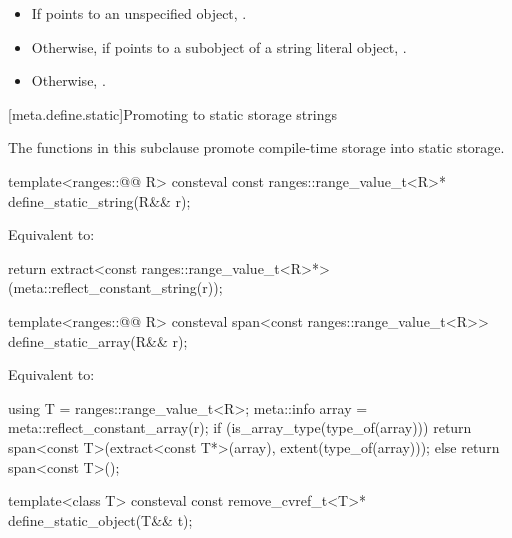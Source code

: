 \begin{itemdescr}
\pnum
\returns
\begin{itemize}
\item
  If  points to an unspecified object,
  .
\item
  Otherwise, if  points to a subobject
  of a string literal object,
  .
\item
  Otherwise, .
\end{itemize}
\end{itemdescr}

[meta.define.static]{Promoting to static storage strings}

\pnum
The functions in this subclause promote compile-time storage into static storage.

%
\begin{itemdecl}
template<ranges::@@ R>
  consteval const ranges::range_value_t<R>* define_static_string(R&& r);
\end{itemdecl}

\begin{itemdescr}
\pnum
\effects
Equivalent to:
\begin{codeblock}
return extract<const ranges::range_value_t<R>*>(meta::reflect_constant_string(r));
\end{codeblock}
\end{itemdescr}

%
\begin{itemdecl}
template<ranges::@@ R>
  consteval span<const ranges::range_value_t<R>> define_static_array(R&& r);
\end{itemdecl}

\begin{itemdescr}
\pnum
\effects
Equivalent to:
\begin{codeblock}
using T = ranges::range_value_t<R>;
meta::info array = meta::reflect_constant_array(r);
if (is_array_type(type_of(array))) {
  return span<const T>(extract<const T*>(array), extent(type_of(array)));
} else {
  return span<const T>();
}
\end{codeblock}
\end{itemdescr}

%
\begin{itemdecl}
template<class T>
  consteval const remove_cvref_t<T>* define_static_object(T&& t);
\end{itemdecl}

